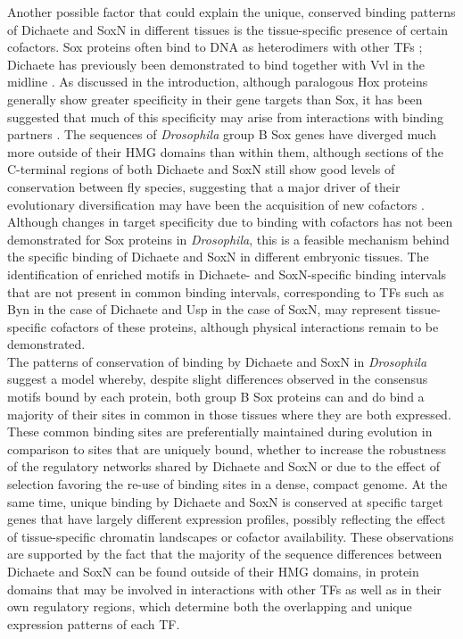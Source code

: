 Another possible factor that could explain the unique, conserved binding patterns of Dichaete and SoxN in different tissues is the tissue-specific presence of certain cofactors. Sox proteins often bind to DNA as heterodimers with other TFs \citep{ambrosetti_synergistic_1997,archer_interaction_2011,bery_characterization_2013,bonneaud_sncf_2003}; Dichaete has previously been demonstrated to bind together with Vvl in the midline \citep{ma_functional_2000,soriano_drosophila_1998}. As discussed in the introduction, although paralogous Hox proteins generally show greater specificity in their gene targets than Sox, it has been suggested that much of this specificity may arise from interactions with binding partners \citep{chan_switching_1997,mann_chapter_2009,slattery_genome-wide_2011}. The sequences of \emph{Drosophila} group B Sox genes have diverged much more outside of their HMG domains than within them, although sections of the C-terminal regions of both Dichaete and SoxN still show good levels of conservation between fly species, suggesting that a major driver of their evolutionary diversification may have been the acquisition of new cofactors \citep{mckimmie_conserved_2005}. Although changes in target specificity due to binding with cofactors has not been demonstrated for Sox proteins in \emph{Drosophila}, this is a feasible mechanism behind the specific binding of Dichaete and SoxN in different embryonic tissues. The identification of enriched motifs in Dichaete- and SoxN-specific binding intervals that are not present in common binding intervals, corresponding to TFs such as Byn in the case of Dichaete and Usp in the case of SoxN, may represent tissue-specific cofactors of these proteins, although physical interactions remain to be demonstrated.\\

The patterns of conservation of binding by Dichaete and SoxN in \emph{Drosophila} suggest a model whereby, despite slight differences observed in the consensus motifs bound by each protein, both group B Sox proteins can and do bind a majority of their sites in common in those tissues where they are both expressed. These common binding sites are preferentially maintained during evolution in comparison to sites that are uniquely bound, whether to increase the robustness of the regulatory networks shared by Dichaete and SoxN or due to the effect of selection favoring the re-use of binding sites in a dense, compact genome. At the same time, unique binding by Dichaete and SoxN is conserved at specific target genes that have largely different expression profiles, possibly reflecting the effect of tissue-specific chromatin landscapes or cofactor availability. These observations are supported by the fact that the majority of the sequence differences between Dichaete and SoxN can be found outside of their HMG domains, in protein domains that may be involved in interactions with other TFs as well as in their own regulatory regions, which determine both the overlapping and unique expression patterns of each TF.

